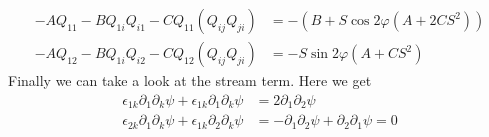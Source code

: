 \documentclass[reqno]{article}
\begin{document}
	\begin{align}
		- A Q_{11} - B Q_{1i}Q_{i1} - C Q_{11}(Q_{ij}Q_{ji}) &= -\left(B + S\cos2\varphi \left(A + 2C S^2 \right)\right) \\
		- A Q_{12} - B Q_{1i}Q_{i2} - C Q_{12}(Q_{ij}Q_{ji}) &= -S\sin2\varphi\left(A + CS^2\right)
	\end{align}
	Finally we can take a look at the stream term. Here we get
	\begin{align}
		\epsilon_{1k}\partial_1 \partial_k \psi + \epsilon_{1k}\partial_1\partial_k \psi &= 2\partial_1\partial_2 \psi \\
		\epsilon_{2k}\partial_1 \partial_k \psi + \epsilon_{1k}\partial_2\partial_k \psi &= 
		-\partial_1\partial_2 \psi + \partial_2\partial_1\psi = 0
	\end{align}
	
\end{document}
